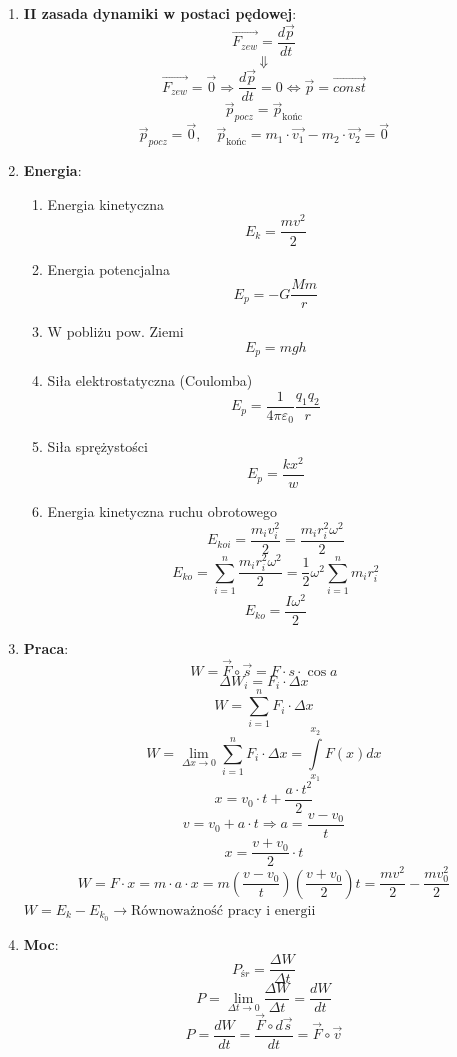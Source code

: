 \documentclass{article}
\begin{document}
\begin{enumerate}
		\item \textbf{II zasada dynamiki w postaci pędowej}:
		\[
		\overrightarrow{F_{zew}} = \frac{d \vec{p}}{dt}
		\]
		\[
		\Downarrow
		\]
		\[
		\overrightarrow{F_{zew}} = \vec{0} \Rightarrow \frac{d \vec{p}}{dt} = 0 \Leftrightarrow \vec{p} = \overrightarrow{const}
		\]
		\[
		\vec{p}_{pocz} = \vec{p}_{\text{końc}}
		\]
		\[
		\vec{p}_{pocz} = \vec{0}, \quad \vec{p}_{\text{końc}}= m_1 \cdotp \overrightarrow{v_1} - m_2 \cdotp \overrightarrow{v_2} = \vec{0}
		\]
		
		\item \textbf{Energia}:
		\begin{enumerate}
			\item Energia kinetyczna
			\[
			E_k = \frac{mv^2}{2}
			\]
			\item Energia potencjalna
			\[
			E_p = -G \frac{Mm}{r}
			\]
			\item W pobliżu pow. Ziemi
			\[
			E_p = mgh
			\]
			\item Siła elektrostatyczna (Coulomba)
			\[
			E_p = \frac{1}{4 \pi \varepsilon_0} \frac{q_1 q_2}{r}
			\]
			\item Siła sprężystości
			\[
			E_p = \frac{kx^2}{w}
			\]
			\item Energia kinetyczna ruchu obrotowego
			\[
			E_{koi} = \frac{m_i v_i^2}{2} = \frac{m_i r_i^2 \omega^2}{2}
			\]
			\[
			E_{ko} = \sum\limits_{i = 1}^n \frac{m_i r_i^2 \omega^2}{2} = \frac{1}{2} \omega^2 \sum\limits_{i = 1}^n m_i r_i^2
			\]
			\[
			E_{ko} = \frac{I \omega^2}{2}
			\]
		\end{enumerate}
		
		\item \textbf{Praca}:
		\[
		W = \vec{F} \circ \vec{s} = F \cdot s \cdot \cos a
		\]
		\[
		\Delta W_i = F_i \cdot \Delta x
		\]
		\[
		W = \sum\limits_{i = 1}^n F_i \cdot \Delta x
		\]
		\[
		W = \lim\limits_{\Delta x \rightarrow 0} \sum\limits_{i = 1}^n F_i \cdot \Delta x = \int\limits_{x_1}^{x_2} F(x)dx
		\]
		\[
		x = v_0 \cdot t + \frac{a \cdot t^2}{2}
		\]
		\[
		v = v_0 + a \cdot t \Rightarrow a = \frac{v - v_0}{t}
		\]
		\[
		x = \frac{v + v_0}{2} \cdot t
		\]
		\[
		W = F \cdot x = m \cdot a \cdot x = m \left( \frac{v - v_0}{t} \right) \left( \frac{v + v_0}{2} \right)t = \frac{mv^2}{2} - \frac{mv_0^2}{2}
		\]
		$
		W = E_k - E_{k_0} \longrightarrow \text{Równoważność pracy i energii}
		$
		
		\item \textbf{Moc}:
		\[
		P_{śr} = \frac{\Delta W}{\Delta t}
		\]
		\[
		P = \lim\limits_{\Delta t \rightarrow 0} \frac{\Delta W}{\Delta t} = \frac{dW}{dt}
		\]
		\[
		P = \frac{dW}{dt} = \frac{\vec{F} \circ d \vec{s}}{dt} = \vec{F} \circ \vec{v}
		\]
		

\end{enumerate}
\end{document}
